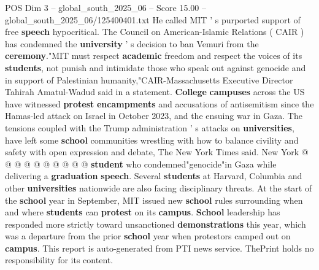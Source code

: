 \begin{textsample}{POS Dim 3 – global\_south\_2025\_06 – Score 15.00 – global\_south\_2025\_06/125400401.txt}
He called MIT ' s purported support of free \textbf{speech} hypocritical.
The Council on American-Islamic Relations ( CAIR ) has condemned the \textbf{university} ' s decision to ban Vemuri from the \textbf{ceremony}."MIT must respect \textbf{academic} freedom and respect the voices of its \textbf{students}, not punish and intimidate those who speak out against genocide and in support of Palestinian humanity,"CAIR-Massachusetts Executive Director Tahirah Amatul-Wadud said in a statement. \textbf{College} \textbf{campuses} across the US have witnessed \textbf{protest} \textbf{encampments} and accusations of antisemitism since the Hamas-led attack on Israel in October 2023, and the ensuing war in Gaza.
The tensions coupled with the Trump administration ' s attacks on \textbf{universities}, have left some \textbf{school} communities wrestling with how to balance civility and safety with open expression and debate, The New York Times said.
New York @ @ @ @ @ @ @ @ @ @ \textbf{student} who condemned"genocide"in Gaza while delivering a \textbf{graduation} \textbf{speech}.
Several \textbf{students} at Harvard, Columbia and other \textbf{universities} nationwide are also facing disciplinary threats.
At the start of the \textbf{school} year in September, MIT issued new \textbf{school} rules surrounding when and where \textbf{students} can \textbf{protest} on its \textbf{campus}. \textbf{School} leadership has responded more strictly toward unsanctioned \textbf{demonstrations} this year, which was a departure from the prior \textbf{school} year when protestors camped out on \textbf{campus}.
This report is auto-generated from PTI news service.
ThePrint holds no responsibility for its content.

\end{textsample}
